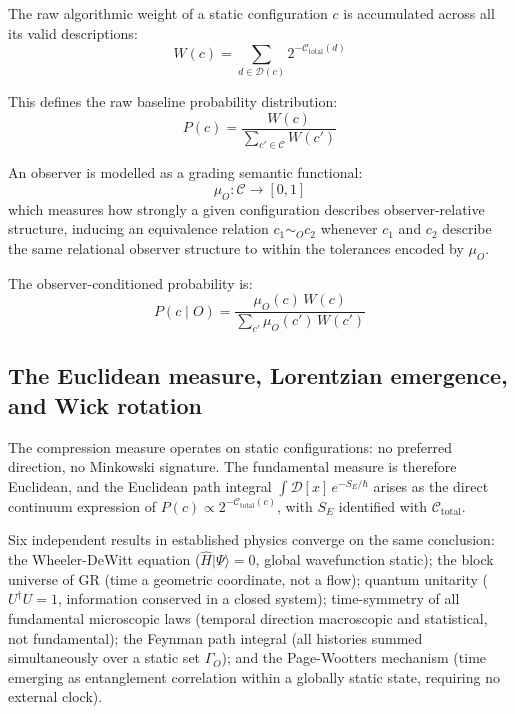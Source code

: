 \documentclass[12pt,a4paper]{article}
\newcommand{\Ctotal}{\mathcal{C}_{\mathrm{total}}}
\newcommand{\muO}{\mu_O}
\begin{document}
The raw algorithmic weight of a static configuration $c$ is accumulated across
all its valid descriptions:
\begin{equation}
W(c) = \sum_{d \in \mathcal{D}(c)} 2^{-\Ctotal(d)}
\end{equation}

This defines the raw baseline probability distribution:
\begin{equation}
P(c) = \frac{W(c)}{\sum_{c' \in \mathcal{C}} W(c')}
\end{equation}

An observer is modelled as a grading semantic functional:
\begin{equation}
\muO : \mathcal{C} \to [0,1]
\end{equation}
which measures how strongly a given configuration describes observer-relative
structure, inducing an equivalence relation $c_1 \sim_O c_2$ whenever $c_1$
and $c_2$ describe the same relational observer structure to within the
tolerances encoded by $\muO$.

The observer-conditioned probability is:
\begin{equation}
P(c \mid O) = \frac{\muO(c)\,W(c)}{\sum_{c'} \muO(c')\,W(c')}
\end{equation}




\subsection*{The Euclidean measure, Lorentzian emergence, and Wick rotation}
\label{subs:wick}

The compression measure operates on static configurations: no preferred direction, no Minkowski signature. The fundamental measure is therefore Euclidean, and the Euclidean path integral $\int \mathcal{D}[x]\, e^{-S_E/\hbar}$ arises as the direct continuum expression of $P(c) \propto 2^{-\Ctotal(c)}$, with $S_E$ identified with $\Ctotal$.

Six independent results in established physics converge on the same conclusion: the Wheeler-DeWitt equation ($\hat{H}|\Psi\rangle = 0$, global wavefunction static); the block universe of GR (time a geometric coordinate, not a flow); quantum unitarity ($U^\dagger U = 1$, information conserved in a closed system); time-symmetry of all fundamental microscopic laws (temporal direction macroscopic and statistical, not fundamental); the Feynman path integral (all histories summed simultaneously over a static set $\Gamma_O$); and the Page-Wootters mechanism (time emerging as entanglement correlation within a globally static state, requiring no external clock).
\end{document}
